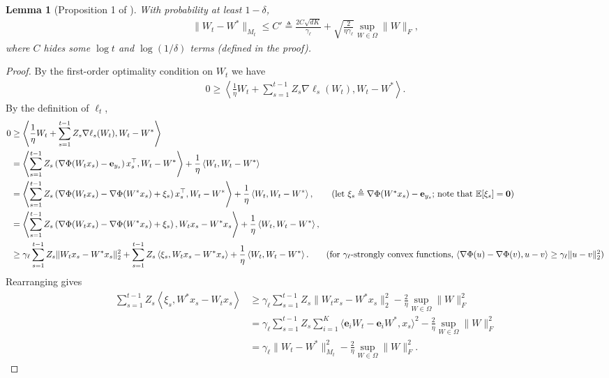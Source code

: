 \documentclass{article}
\newcommand{\nb}{\nabla}
\newcommand{\e}{\mathbf{e}}
\newcommand{\field}[1]{\mathbb{#1}}
\newcommand{\E}{\field{E}}
\newcommand{\inner}[1]{ \left\langle {#1} \right\rangle }
\newtheorem{lemma}[theorem]{Lemma}
\begin{document}
\begin{lemma}[Proposition 1 of \cite{agarwal2013selective}]
\label{lem:decreasing error}
With probability at least $1-\delta$,
\begin{align*}
\|W_t-W^*\|_{M_t} \leq C' \triangleq \frac{2C\sqrt{dK}}{\gamma_\ell} + \sqrt{\frac{2}{\eta \gamma_\ell}}\sup_{W\in \Omega}\|W\|_F, 
\end{align*}
where $C$ hides some $\log t$ and $\log(1/\delta)$ terms (defined in the proof). 
\end{lemma}

\begin{proof}
By the first-order optimality condition on $W_{t}$ we have
\begin{align*}
    0\geq \inner{\frac{1}{\eta} W_{t} + \sum_{s=1}^{t-1} Z_s\nb\ell_s(W_t), W_{t}-W^*}. 
\end{align*}
By the definition of $\ell_t$, 
\begin{align*}
    0 &\geq \inner{\frac{1}{\eta} W_{t} + \sum_{s=1}^{t-1} Z_s\nb\ell_s(W_t),  W_{t}-W^*} \\
    & = \inner{\sum_{s=1}^{t-1} Z_s\left(\nb\Phi(W_t x_s) - \e_{y_s} \right)x_s^\top,  W_{t}-W^*} + \frac{1}{\eta}\inner{W_t, W_t-W^*} \\
    & = \inner{\sum_{s=1}^{t-1} Z_s\left(\nb\Phi(W_t x_s) - \nb\Phi(W^*x_s) + \xi_s \right)x_s^\top, W_{t}-W^*} + \frac{1}{\eta}\inner{W_t, W_t-W^*} , \tag{let $\xi_s\triangleq \nb\Phi(W^*x_s)-\e_{y_s}$; note that $\E[\xi_s]=\mathbf{0}$} \\ 
    & = \inner{\sum_{s=1}^{t-1} Z_s\left(\nb\Phi(W_t x_s) - \nb\Phi(W^*x_s) + \xi_s \right), W_t x_s- W^*x_s} + \frac{1}{\eta}\inner{W_t, W_t-W^*}, \\
    & \geq \gamma_\ell \sum_{s=1}^{t-1} Z_s\|W_tx_s-W^*x_s\|_2^2 + \sum_{s=1}^{t-1} Z_s\inner{\xi_s, W_tx_s-W^*x_s} + \frac{1}{\eta} \inner{W_t, W_t-W^*}. \tag{for $\gamma_\ell$-strongly convex functions, $\inner{\nb\Phi(u)-\nb\Phi(v), u-v}\geq \gamma_\ell\|u-v\|_2^2$}
\end{align*}
Rearranging gives 
\begin{align}
    \sum_{s=1}^{t-1} Z_s\inner{\xi_s, W^*x_s-W_tx_s} &\geq \gamma_\ell \sum_{s=1}^{t-1} Z_s\|W_tx_s-W^*x_s\|_2^2 - \frac{2}{\eta} \sup_{W\in \Omega}\|W\|_F^2 \nonumber \\
    &= \gamma_\ell \sum_{s=1}^{t-1} Z_s\sum_{i=1}^K \langle \e_iW_t-\e_iW^*, x_s\rangle^2 - \frac{2}{\eta} \sup_{W\in \Omega}\|W\|_F^2 \nonumber \\
    & = \gamma_\ell \|W_t-W^*\|_{M_t}^2 - \frac{2}{\eta} \sup_{W\in \Omega}\|W\|_F^2.  \label{eqn:lower}

\end{align}
\end{proof}
\end{document}
